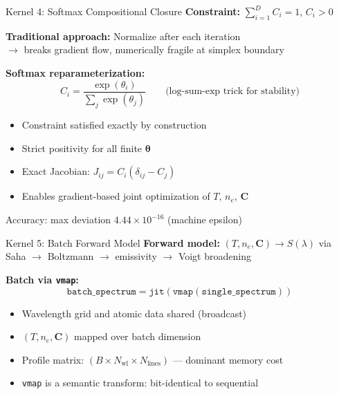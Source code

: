 \documentclass[aspectratio=169,10pt]{beamer}
\begin{document}
\begin{frame}{Kernel 4: Softmax Compositional Closure}
	\textbf{Constraint:} $\sum_{i=1}^D C_i = 1$, \quad $C_i > 0$

	\vspace{0.5em}
	\textbf{Traditional approach:} Normalize after each iteration\\
	$\to$ breaks gradient flow, numerically fragile at simplex boundary

	\vspace{0.5em}
	\textbf{Softmax reparameterization:}
	\begin{equation*}
		C_i = \frac{\exp(\theta_i)}{\sum_{j} \exp(\theta_j)}
		\qquad\text{(log-sum-exp trick for stability)}
	\end{equation*}

	\begin{itemize}
		\item Constraint satisfied \alert{exactly by construction}
		\item Strict positivity for all finite $\bm{\theta}$
		\item Exact Jacobian: $J_{ij} = C_i(\delta_{ij} - C_j)$
		\item Enables gradient-based joint optimization of $T$, $n_e$, $\bm{C}$
	\end{itemize}

	\vspace{0.3em}
	Accuracy: max deviation $4.44 \times 10^{-16}$ (machine epsilon)
\end{frame}

\begin{frame}{Kernel 5: Batch Forward Model}
	{\small\textbf{Forward model:} $(T, n_e, \bm{C}) \to S(\lambda)$ via
	Saha $\to$ Boltzmann $\to$ emissivity $\to$ Voigt broadening}

	\vspace{0.2em}
	\textbf{Batch via \texttt{vmap}:}
	\begin{equation*}
		\texttt{batch\_spectrum} = \texttt{jit}(\texttt{vmap}(\texttt{single\_spectrum}))
	\end{equation*}

	\vspace{-0.3em}
	\begin{itemize}
		\item {\small Wavelength grid and atomic data \alert{shared} (broadcast)}
		\item {\small $(T, n_e, \bm{C})$ \alert{mapped} over batch dimension}
		\item {\small Profile matrix: $(B \times N_\text{wl} \times N_\text{lines})$ --- dominant memory cost}
		\item {\small \texttt{vmap} is a semantic transform: \alert{bit-identical} to sequential}
	\end{itemize}
\end{frame}
\end{document}
